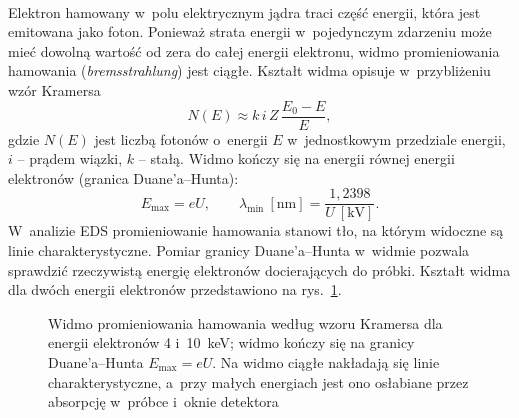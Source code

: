 \paragraph{}
Elektron hamowany w~polu elektrycznym jądra traci część energii, która
jest emitowana jako foton. Ponieważ strata energii w~pojedynczym
zdarzeniu może mieć dowolną wartość od zera do całej energii elektronu,
widmo promieniowania hamowania (\emph{bremsstrahlung}) jest ciągłe.
Kształt widma opisuje w~przybliżeniu wzór Kramersa
\begin{equation}
  N(E) \approx k\,i\,Z\,\frac{E_0-E}{E},
\end{equation}
gdzie $N(E)$ jest liczbą fotonów o~energii $E$ w~jednostkowym przedziale
energii, $i$ -- prądem wiązki, $k$ -- stałą. Widmo kończy się na
energii równej energii elektronów (granica Duane'a--Hunta):
\begin{equation}
  E_\mathrm{max} = eU, \qquad
  \lambda_\mathrm{min}~[\si{\nano\metre}] = \frac{1{,}2398}{U~[\si{\kilo\volt}]}.
\end{equation}
W~analizie EDS promieniowanie hamowania stanowi tło, na którym widoczne
są linie charakterystyczne. Pomiar granicy Duane'a--Hunta w~widmie pozwala
sprawdzić rzeczywistą energię elektronów docierających do próbki. Kształt widma dla dwóch energii elektronów przedstawiono na
rys.~\ref{fig:kramers}.

\begin{figure}[htbp]
  \centering
  \caption{Widmo promieniowania hamowania według wzoru Kramersa dla
    energii elektronów \SI{4}{} i~\SI{10}{\kilo\electronvolt};
    widmo kończy się na granicy Duane'a--Hunta
    $E_\mathrm{max}=eU$. Na widmo ciągłe nakładają się linie
    charakterystyczne, a~przy małych energiach jest ono osłabiane przez
    absorpcję w~próbce i~oknie detektora}
  \label{fig:kramers}
\end{figure}

